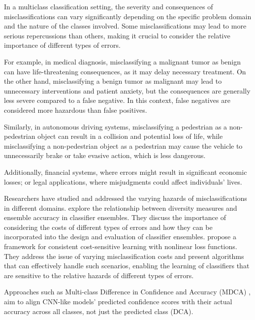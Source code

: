 In a multiclass classification setting, the severity and consequences of misclassifications can vary significantly depending on the specific problem domain and the nature of the classes involved. Some misclassifications may lead to more serious repercussions than others, making it crucial to consider the relative importance of different types of errors.

For example, in medical diagnosis, misclassifying a malignant tumor as benign can have life-threatening consequences, as it may delay necessary treatment. On the other hand, misclassifying a benign tumor as malignant may lead to unnecessary interventions and patient anxiety, but the consequences are generally less severe compared to a false negative. In this context, false negatives are considered more hazardous than false positives.

Similarly, in autonomous driving systems, misclassifying a pedestrian as a non-pedestrian object can result in a collision and potential loss of life, while misclassifying a non-pedestrian object as a pedestrian may cause the vehicle to unnecessarily brake or take evasive action, which is less dangerous.

Additionally, financial systems, where errors might result in significant economic losses; or legal applications, where misjudgments could affect individuals' lives.

Researchers have studied and addressed the varying hazards of misclassifications in different domains. \cite{kuncheva2006measures} explore the relationship between diversity measures and ensemble accuracy in classifier ensembles. They discuss the importance of considering the costs of different types of errors and how they can be incorporated into the design and evaluation of classifier ensembles.
\cite{mozannar2020consistent} propose a framework for consistent cost-sensitive learning with nonlinear loss functions. They address the issue of varying misclassification costs and present algorithms that can effectively handle such scenarios, enabling the learning of classifiers that are sensitive to the relative hazards of different types of errors.

Approaches such as Multi-class Difference in Confidence and Accuracy (MDCA) \cite{hebbalaguppe2022stitch}, aim to align CNN-like models' predicted confidence scores with their actual accuracy across all classes, not just the predicted class (DCA).


